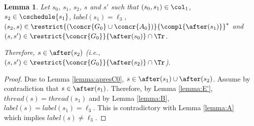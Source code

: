 \documentclass[12pt]{article}
\let\firstunion\cup
\let\firstinter\cap
\let\cup\firstunion
\let\cap\firstinter
\newcommand{\lbl}{\mathit{label}}
\newcommand{\thread}{\mathit{thread}}
\newtheorem{lemma}{Lemma}
\begin{document}
\begin{lemma}\label{lemma:apresC}
 Let \(s_0\), \(s_1\), \(s_2\), \(s\) and \(s'\) such that \((s_0,s_1)\in\col_1\), \(s_2\in\cschedule\{s_1\}\), \(\lbl(s_1)=\ell_3\), \((s_2,s)\in\restrict{(\concr{G_0}\cup\concr{A_0})}{\compl{\after(s_1)}}^{\star}\) and \((s,s') \in\restrict{\concr{G_0}}{\after(s_0)}\cap\Tr \).
 
 Therefore, \(s\in\after(s_2)\) (i.e.,  \((s,s') \in\restrict{\concr{G_0}}{\after(s_2)}\cap\Tr \)).
\end{lemma}
\begin{proof}
 Due to Lemma \ref{lemma:apresC0}, \(s\in\after(s_1) \cup \after(s_2)\).
 Assume by contradiction that \(s\in\after(s_1)\). Therefore, by Lemma \ref{lemma:E'}, \(\thread(s)=\thread(s_1)\) and by Lemma \ref{lemma:B}, \(\lbl(s)=\lbl(s_1)=\ell_3\).
 This is contradictory with Lemma \ref{lemma:A} which implies \(\lbl(s)\neq\ell_3\).
\end{proof}
\end{document}
